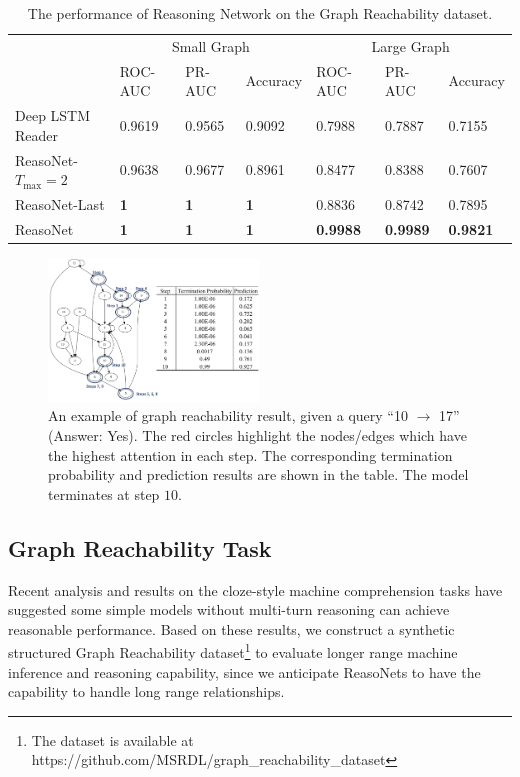 \documentclass[sigconf]{acmart}
\begin{document}
\begin{table}%
	\centering
	{\small
		\caption{The performance of Reasoning Network on the Graph Reachability dataset.}
		\label{tab:reach_table}
		\centering
		\begin{tabular}{lllllll}
			\toprule
			& \multicolumn{3}{c}{Small Graph}  &   \multicolumn{3}{c}{Large Graph}               \\
			\cmidrule{1-7}
			& ROC-AUC & PR-AUC & Accuracy & ROC-AUC & PR-AUC & Accuracy \\
			{Deep LSTM Reader} & 0.9619 & 0.9565 & 0.9092 & 0.7988 & 0.7887 & 0.7155 \\
			{ReasoNet-$T_\text{max}=2$} & 0.9638 & 0.9677 & 0.8961 & 0.8477 & 0.8388 & 0.7607 \\
			{ReasoNet-Last} & \textbf{1} & \textbf{1} & \textbf{1} & 0.8836 & 0.8742 & 0.7895 \\
			
			{ReasoNet} & \textbf{1} & \textbf{1} & \textbf{1} & \textbf{0.9988} & \textbf{0.9989} & \textbf{0.9821} \\    
			\bottomrule
		\end{tabular}
	}
\end{table}

\begin{figure}[h!]
	\centering
	\includegraphics[width=0.5\textwidth]{figure/graph_visualization_w_table}
	\caption{{An example of graph reachability result, given a query ``10 $\rightarrow$ 17'' (Answer: Yes). The red circles highlight the nodes/edges which have the highest attention in each step. The corresponding termination probability and prediction results are shown in the table. The model terminates at step $10$.}}
	\label{fig:graph_visalization}
\end{figure}


\subsection{Graph Reachability Task}
Recent analysis and results \citep{ChenACL2016} on the cloze-style machine comprehension tasks have suggested some simple models without multi-turn reasoning can achieve reasonable performance. Based on these results, we construct a synthetic structured Graph Reachability dataset\footnote{The dataset is available at https://github.com/MSRDL/graph\_reachability\_dataset} to evaluate longer range machine inference and reasoning capability, since we anticipate ReasoNets to have the capability to handle long range relationships.
 
\end{document}
